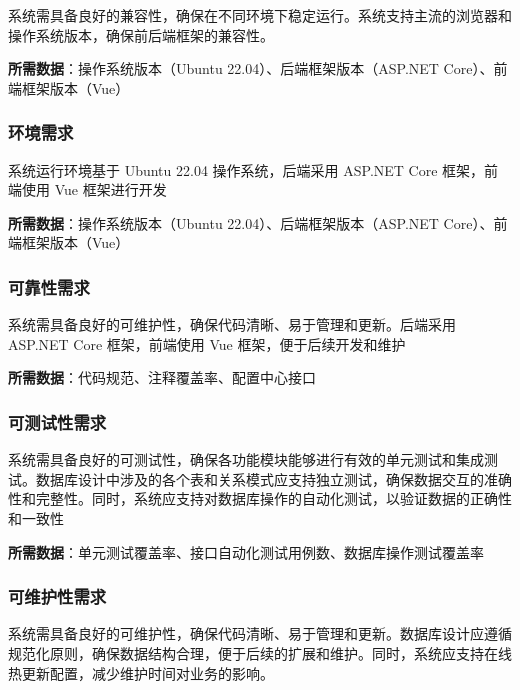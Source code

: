 \documentclass[]{article}
\begin{document}
系统需具备良好的兼容性，确保在不同环境下稳定运行。系统支持主流的浏览器和操作系统版本，确保前后端框架的兼容性。

\textbf{所需数据}：操作系统版本（Ubuntu 22.04）、后端框架版本（ASP.NET
Core）、前端框架版本（Vue）

\hypertarget{ux73afux5883ux9700ux6c42}{%
\subsubsection{环境需求}\label{ux73afux5883ux9700ux6c42}}

系统运行环境基于 Ubuntu 22.04 操作系统，后端采用 ASP.NET Core
框架，前端使用 Vue 框架进行开发

\textbf{所需数据}：操作系统版本（Ubuntu 22.04）、后端框架版本（ASP.NET
Core）、前端框架版本（Vue）

\hypertarget{ux53efux9760ux6027ux9700ux6c42-1}{%
\subsubsection{可靠性需求}\label{ux53efux9760ux6027ux9700ux6c42-1}}

系统需具备良好的可维护性，确保代码清晰、易于管理和更新。后端采用 ASP.NET
Core 框架，前端使用 Vue 框架，便于后续开发和维护

\textbf{所需数据}：代码规范、注释覆盖率、配置中心接口

\hypertarget{ux53efux6d4bux8bd5ux6027ux9700ux6c42}{%
\subsubsection{可测试性需求}\label{ux53efux6d4bux8bd5ux6027ux9700ux6c42}}

系统需具备良好的可测试性，确保各功能模块能够进行有效的单元测试和集成测试。数据库设计中涉及的各个表和关系模式应支持独立测试，确保数据交互的准确性和完整性。同时，系统应支持对数据库操作的自动化测试，以验证数据的正确性和一致性

\textbf{所需数据}：单元测试覆盖率、接口自动化测试用例数、数据库操作测试覆盖率

\hypertarget{ux53efux7ef4ux62a4ux6027ux9700ux6c42}{%
\subsubsection{可维护性需求}\label{ux53efux7ef4ux62a4ux6027ux9700ux6c42}}

系统需具备良好的可维护性，确保代码清晰、易于管理和更新。数据库设计应遵循规范化原则，确保数据结构合理，便于后续的扩展和维护。同时，系统应支持在线热更新配置，减少维护时间对业务的影响。
\end{document}
